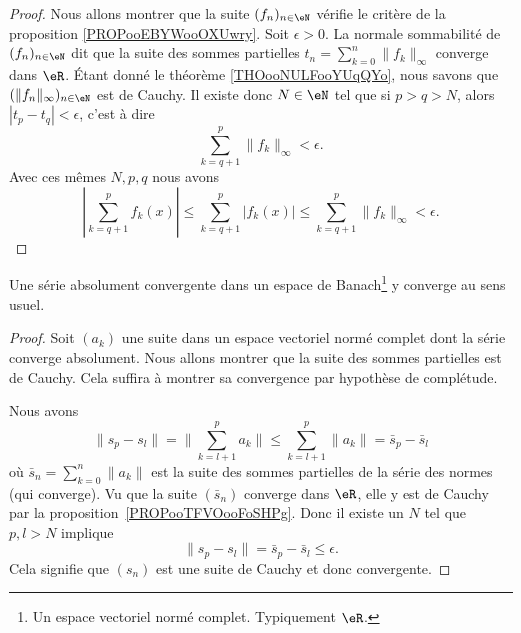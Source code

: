 \begin{proof}
	Nous allons montrer que la suite \( (f_n)_{n\in \eN}\) vérifie le critère de la proposition \ref{PROPooEBYWooOXUwry}. Soit \( \epsilon>0\). La normale sommabilité de \( (f_n)_{n\in \eN} \) dit que la suite des sommes partielles \( t_n=\sum_{k=0}^n\| f_k \|_{\infty}\) converge dans \( \eR\). Étant donné le théorème \ref{THOooNULFooYUqQYo}, nous savons que \( (\| f_n \|_{\infty})_{n\in \eN}\) est de Cauchy. Il existe donc \( N\in \eN\) tel que si \( p>q>N\), alors \( | t_p-t_q |<\epsilon\), c'est à dire
	\begin{equation}
		\sum_{k=q+1}^p\| f_k \|_{\infty}<\epsilon.
	\end{equation}
	Avec ces mêmes \( N,p,q\) nous avons
	\begin{equation}
		| \sum_{k=q+1}^pf_k(x) |\leq\sum_{k=q+1}^p| f_k(x) |\leq\sum_{k=q+1}^p\| f_k \|_{\infty}<\epsilon.
	\end{equation}
\end{proof}

\begin{proposition} \label{PropAKCusNM}
	Une série absolument convergente dans un espace de Banach\footnote{Un espace vectoriel normé complet. Typiquement \( \eR\).} y converge au sens usuel.
\end{proposition}

\begin{proof}
	Soit \( (a_k)\) une suite dans un espace vectoriel normé complet dont la série converge absolument. Nous allons montrer que la suite des sommes partielles est de Cauchy. Cela suffira à montrer sa convergence par hypothèse de complétude.

	Nous avons
	\begin{equation}
		\| s_p-s_l \|=\| \sum_{k=l+1}^{p}a_k\|  \leq\sum_{k=l+1}^p\| a_k \|=\bar s_p-\bar s_l
	\end{equation}
	où \( \bar s_n=\sum_{k=0}^n \| a_k \|\) est la suite des sommes partielles de la série des normes (qui converge). Vu que la suite \( (\bar s_n)\) converge dans \( \eR\), elle y est de Cauchy par la proposition~\ref{PROPooTFVOooFoSHPg}. Donc il existe un \( N\) tel que \( p,l>N\) implique
	\begin{equation}
		\| s_p-s_l \|=\bar s_p-\bar s_l\leq \epsilon.
	\end{equation}
	Cela signifie que \( (s_n)\) est une suite de Cauchy et donc convergente.
\end{proof}

